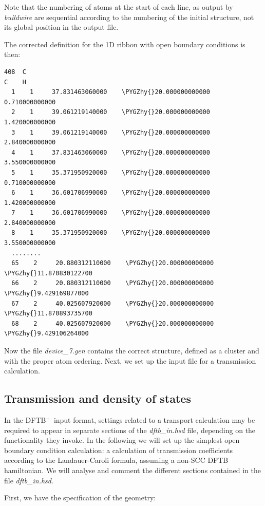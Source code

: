 \documentclass[a4paper,11pt,english]{sphinxmanual}
\newcommand{\dftbp}{\textsf{DFTB$^{\text{+}}$\ }} %
\def\PYGZhy{\char`\-}
\begin{document}
{{Note that the numbering of atoms at the start of each line, as output
by \emph{buildwire} are sequential according to the numbering of the
initial structure, not its global position in the output file.

The corrected definition for the 1D ribbon with open boundary
conditions is then:

\begin{Verbatim}[commandchars=\\\{\}]
408  C
C    H
  1    1     37.831463060000    \PYGZhy{}20.000000000000      0.710000000000
  2    1     39.061219140000    \PYGZhy{}20.000000000000      1.420000000000
  3    1     39.061219140000    \PYGZhy{}20.000000000000      2.840000000000
  4    1     37.831463060000    \PYGZhy{}20.000000000000      3.550000000000
  5    1     35.371950920000    \PYGZhy{}20.000000000000      0.710000000000
  6    1     36.601706990000    \PYGZhy{}20.000000000000      1.420000000000
  7    1     36.601706990000    \PYGZhy{}20.000000000000      2.840000000000
  8    1     35.371950920000    \PYGZhy{}20.000000000000      3.550000000000
  ........
  65    2     20.880312110000    \PYGZhy{}20.000000000000    \PYGZhy{}11.870830122700
  66    2     20.880312110000    \PYGZhy{}20.000000000000     \PYGZhy{}9.429169877000
  67    2     40.025607920000    \PYGZhy{}20.000000000000    \PYGZhy{}11.870893735700
  68    2     40.025607920000    \PYGZhy{}20.000000000000     \PYGZhy{}9.429106264000
\end{Verbatim}

Now the file \emph{device\_7.gen} contains the correct structure, defined as
a cluster and with the proper atom ordering. Next, we set up the input
file for a transmission calculation.


\subsection{Transmission and density of states}
\label{transport:transmission-and-density-of-states}
In the \dftbp input format, settings related to a transport
calculation may be required to appear in separate sections of the
\emph{dftb\_in.hsd} file, depending on the functionality they invoke. In the
following we will set up the simplest open boundary condition
calculation: a calculation of transmission coefficients according to
the Landauer-Caroli formula, assuming a non-SCC DFTB hamiltonian. We
will analyse and comment the different sections contained in the file
\emph{dftb\_in.hsd}.

First, we have the specification of the geometry:

}}
\end{document}
